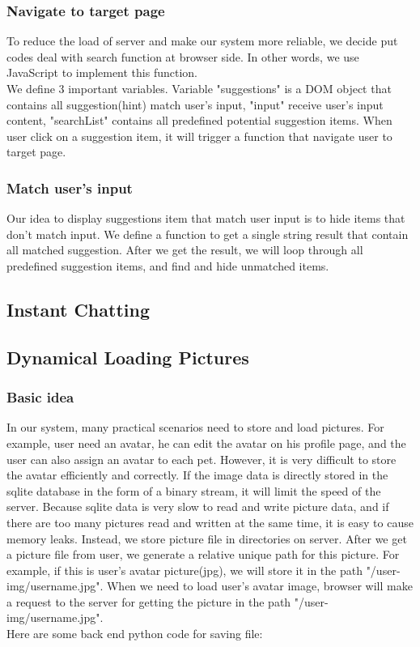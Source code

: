 \documentclass[a4paper]{article}
\begin{document}
\subsubsection{Navigate to target page}
To reduce the load of server and make our system more reliable, we decide put codes deal with search function at browser side. In other words, we use JavaScript to implement this function.
\quad\\
We define 3 important variables. Variable "suggestions" is a DOM object that contains all suggestion(hint) match user's input, "input" receive user's input content, "searchList" contains all predefined potential suggestion items. When user click on a suggestion item, it will trigger a function that navigate user to target page.

\subsubsection{Match user's input}
Our idea to display suggestions item that match user input is to  hide items that don't match input. We define a function to get a single string result that contain all matched suggestion. After we get the result, we will loop through all predefined suggestion items, and find and hide unmatched items. 

\subsection{Instant Chatting}
\subsection{Dynamical Loading Pictures}
\subsubsection{Basic idea}
In our system, many practical scenarios need to store and load pictures. For example, user need an avatar, he can edit the avatar on his profile page, and the user can also assign an avatar to each pet. However, it is very difficult to store the avatar efficiently and correctly. If the image data is directly stored in the sqlite database in the form of a binary stream, it will limit the speed of the server. Because sqlite data is very slow to read and write picture data, and if there are too many pictures read and written at the same time, it is easy to cause memory leaks. Instead, we store picture file in directories on server. After we get a picture file from user, we generate a relative unique path for this picture. For example, if this is user's avatar picture(jpg), we will store it in the path "/user-img/username.jpg". When we need to load user's avatar image, browser will make a request to the server for getting the picture in the path "/user-img/username.jpg".
\quad\\
Here are some back end python code for saving file:

\end{document}

